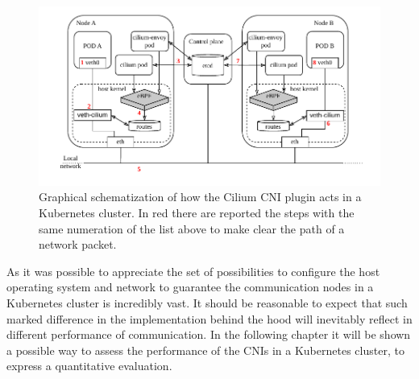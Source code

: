 \begin{figure}
  \centering
  \includegraphics[width=\textwidth]{img/chpt2/CNI-cilium}
  \caption{Graphical schematization of how the Cilium CNI plugin acts in a
    Kubernetes cluster. In red there are reported the steps with the same
    numeration of the list above to make clear the path of a network packet.}
  \label{fig:cni-cilium}
\end{figure}


As it was possible to appreciate the set of possibilities to configure the host
operating system and network to guarantee the communication nodes in a
Kubernetes cluster is incredibly vast.
It should be reasonable to expect that such marked difference in the
implementation behind the hood will inevitably reflect in different performance
of communication.
In the following chapter it will be shown a possible way to assess the
performance of the CNIs in a Kubernetes cluster, to express a quantitative
evaluation.
